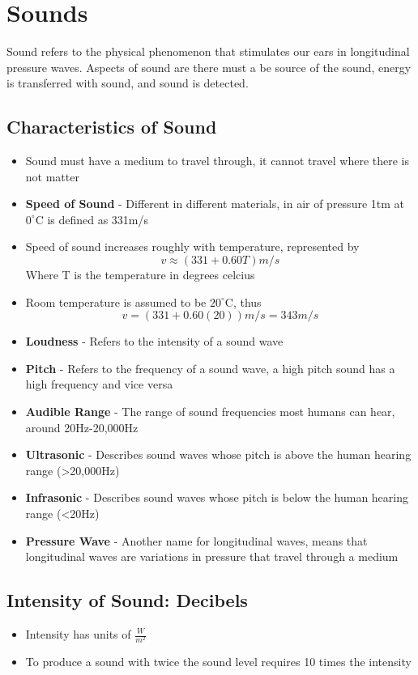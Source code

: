 \section{Sounds}
Sound refers to the physical phenomenon that stimulates our ears in longitudinal pressure waves. Aspects of sound are there must a be source of the sound, energy is transferred with sound, and sound is detected.

\subsection{Characteristics of Sound}
\begin{itemize}
    \item Sound must have a medium to travel through, it cannot travel where there is not matter
    \item \textbf{Speed of Sound} - Different in different materials, in air of pressure 1tm at \(0^\circ\)C is defined as 331m/s
    \item Speed of sound increases roughly with temperature, represented by \[v\approx(331+0.60T)m/s\] Where T is the temperature in degrees celcius
    \item Room temperature is assumed to be \(20^\circ\)C, thus \[v=(331+0.60(20))m/s=343m/s\]
    \item \textbf{Loudness} - Refers to the intensity of a sound wave
    \item \textbf{Pitch} - Refers to the frequency of a sound wave, a high pitch sound has a high frequency and vice versa
    \item \textbf{Audible Range} - The range of sound frequencies most humans can hear, around 20Hz-20,000Hz
    \item \textbf{Ultrasonic} - Describes sound waves whose pitch is above the human hearing range (>20,000Hz)
    \item \textbf{Infrasonic} - Describes sound waves whose pitch is below the human hearing range (<20Hz)
    \item \textbf{Pressure Wave} - Another name for longitudinal waves, means that longitudinal waves are variations in pressure that travel through a medium
\end{itemize}

\subsection{Intensity of Sound: Decibels}
\begin{itemize}
    \item Intensity has units of \(\frac{W}{m^2}\)
    \item To produce a sound with twice the sound level requires 10 times the intensity
\end{itemize}

